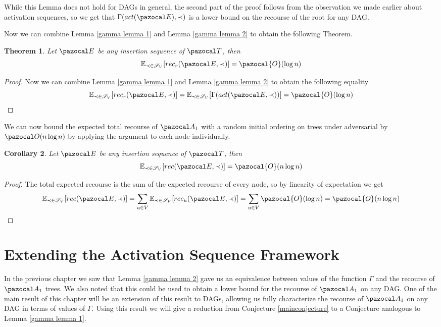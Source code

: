 \documentclass{report}
\newtheorem{theorem}{Theorem}[section]
\newtheorem{corollary}[theorem]{Corollary}
\begin{document}
While this Lemma does not hold for DAGs in general, the second part of the proof follows from the observation we made earlier about activation sequences, so we get that $\Gamma(act(\pazocal E), \prec)$ is a lower bound on the recourse of the root for any DAG.

Now we can combine Lemma \ref{gamma lemma 1} and Lemma \ref{gamma lemma 2} to obtain the following Theorem.

\begin{theorem}
Let $\pazocal E$ be any insertion sequence of $\pazocal T$, then
\[ \mathbb{E}_{\prec \in \mathcal{S}_V}[ rec_r(\pazocal E, \prec)] = \pazocal{O}(\log n) \]
\end{theorem}

\begin{proof}
Now we can combine Lemma \ref{gamma lemma 1} and Lemma \ref{gamma lemma 2} to obtain the following equality
\[ \mathbb{E}_{\prec \in \mathcal{S}_V}[ rec_r(\pazocal E, \prec)] = \mathbb{E}_{\prec \in \mathcal{S}_V}[\Gamma(act(\pazocal E, \prec))] = \pazocal{O}(\log n) \]
\end{proof}

We can now bound the expected total recourse of $\pazocal A_1$ with a random initial ordering on trees under adversarial by $\pazocal O(n \log n)$ by applying the argument to each node individually. 

\begin{corollary}
Let $\pazocal E$ be any insertion sequence of $\pazocal T$, then
\[ \mathbb{E}_{\prec \in \mathcal{S}_V}[ rec(\pazocal E, \prec)] = \pazocal{O}(n\log n) \]
\end{corollary}

\begin{proof}
The total expected recourse is the sum of the expected recourse of every node, so by linearity of expectation we get
\[ \mathbb{E}_{\prec \in \mathcal{S}_V}[ rec(\pazocal E, \prec)] = \sum_{u \in V} \mathbb{E}_{\prec \in \mathcal{S}_V}[ rec_u(\pazocal E, \prec)] = \sum_{u \in V} \pazocal{O}(\log n) = \pazocal{O}(n\log n) \]
\end{proof}


\chapter{Extending the Activation Sequence Framework}\label{chapter7}

In the previous chapter we saw that Lemma \ref{gamma lemma 2} gave us an equivalence between values of the function $\Gamma$ and the recourse of $\pazocal A_1$ trees. We also noted that this could be used to obtain a lower bound for the recourse of $\pazocal A_1$ on any DAG. One of the main result of this chapter will be an extension of this result to DAGs, allowing us fully characterize the recourse of $\pazocal A_1$ on any DAG in terms of values of $\Gamma$. Using this result we will give a reduction from Conjecture \ref{mainconjecture} to a Conjecture analogous to Lemma \ref{gamma lemma 1}.
\end{document}

